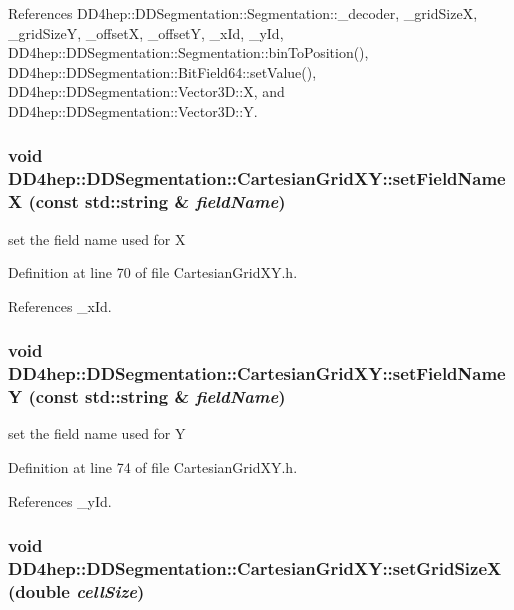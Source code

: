 References DD4hep::DDSegmentation::Segmentation::\_\-decoder, \_\-gridSizeX, \_\-gridSizeY, \_\-offsetX, \_\-offsetY, \_\-xId, \_\-yId, DD4hep::DDSegmentation::Segmentation::binToPosition(), DD4hep::DDSegmentation::BitField64::setValue(), DD4hep::DDSegmentation::Vector3D::X, and DD4hep::DDSegmentation::Vector3D::Y.\hypertarget{class_d_d4hep_1_1_d_d_segmentation_1_1_cartesian_grid_x_y_a2f4cb5d0e804e2489ae2916c9eb3503d}{
\subsubsection[{setFieldNameX}]{\setlength{\rightskip}{0pt plus 5cm}void DD4hep::DDSegmentation::CartesianGridXY::setFieldNameX (const std::string \& {\em fieldName})}}
\label{class_d_d4hep_1_1_d_d_segmentation_1_1_cartesian_grid_x_y_a2f4cb5d0e804e2489ae2916c9eb3503d}


set the field name used for X 

Definition at line 70 of file CartesianGridXY.h.

References \_\-xId.\hypertarget{class_d_d4hep_1_1_d_d_segmentation_1_1_cartesian_grid_x_y_a291b68b5ed0be43c141665b38aeeab52}{
\subsubsection[{setFieldNameY}]{\setlength{\rightskip}{0pt plus 5cm}void DD4hep::DDSegmentation::CartesianGridXY::setFieldNameY (const std::string \& {\em fieldName})}}
\label{class_d_d4hep_1_1_d_d_segmentation_1_1_cartesian_grid_x_y_a291b68b5ed0be43c141665b38aeeab52}


set the field name used for Y 

Definition at line 74 of file CartesianGridXY.h.

References \_\-yId.\hypertarget{class_d_d4hep_1_1_d_d_segmentation_1_1_cartesian_grid_x_y_af4955b8d0693a3ded3a6d14defec4c9e}{
\subsubsection[{setGridSizeX}]{\setlength{\rightskip}{0pt plus 5cm}void DD4hep::DDSegmentation::CartesianGridXY::setGridSizeX (double {\em cellSize})}}
\label{class_d_d4hep_1_1_d_d_segmentation_1_1_cartesian_grid_x_y_af4955b8d0693a3ded3a6d14defec4c9e}


